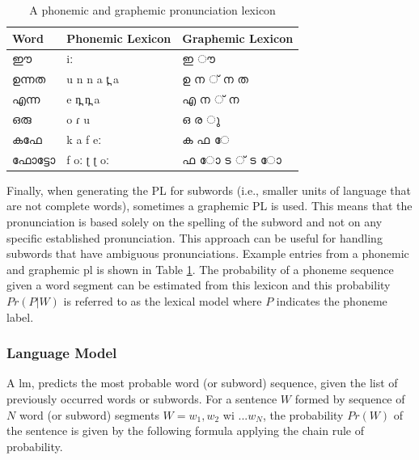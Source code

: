 \begin{table}[h]
	\begin{center}
			\caption{A phonemic and graphemic pronunciation lexicon}
			\label{tab:pl}
			\begin{tabular}{lll}
				\hline\hline
			 Word             & Phonemic Lexicon             & Graphemic Lexicon                      \\
				\hline
				{\mal ഈ}         & {\ipa iː}                               & {\mal ഇ ൗ}                 \\
				 {\mal ഉന്നത}      & {\ipa u n n a t̪ a}                      & {\mal ഉ ന ് ന ത}               \\
			 {\mal  എന്ന}       & {\ipa e n̪ n̪ a }                         & {\mal എ ന ് ന}           \\
			 {\mal  ഒരു}        & {\ipa o ɾ u }                           & {\mal ഒ ര ു}                  \\
			 {\mal കഫേ}       & {\ipa k a f eː}                         & {\mal ക ഫ േ}               \\
			 {\mal ഫോട്ടോ}     & {\ipa f oː ʈ ʈ oː}                      & {\mal ഫ ോ ട ് ട ോ}                    \\
				\hline
			\end{tabular}
	\end{center}
\end{table}


Finally, when generating the PL for subwords (i.e., smaller units of language that are not complete words), sometimes a graphemic PL is used. This means that the pronunciation is based solely on the spelling of the subword and not on any specific established pronunciation. This approach can be useful for handling subwords that have ambiguous pronunciations. Example entries from a phonemic and graphemic \gls{pl} is shown in Table \ref{tab:pl}. The probability of a phoneme sequence given a word segment can be estimated from this lexicon and this probability $Pr(P|W)$ is referred to as the lexical model where $P$ indicates the phoneme  label.



\subsubsection{Language Model}

A \acrfull{lm}, predicts the most probable word (or subword) sequence, given
the list of previously occurred words or subwords. For a sentence $W$ formed by
sequence of $N$ word (or subword) segments $W = w_1,w_2$ \gls{wi} $. . . w_N$, the probability $Pr(W)$
of the sentence is given by the following formula applying the chain rule of
probability.

